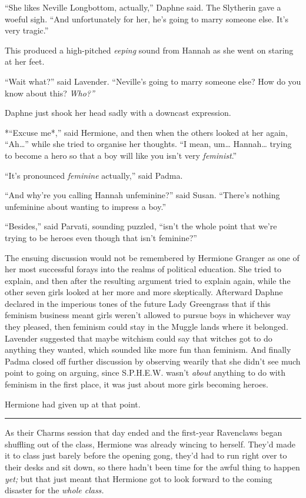 ``She likes Neville Longbottom, actually,'' Daphne said. The Slytherin
gave a woeful sigh. ``And unfortunately for her, he's going to marry
someone else. It's very tragic.''

This produced a high-pitched \emph{eeping} sound from Hannah as she went
on staring at her feet.

``Wait what?'' said Lavender. ``Neville's going to marry someone else?
How do you know about this? \emph{Who?''}

Daphne just shook her head sadly with a downcast expression.

*``Excuse me*,'' said Hermione, and then when the others looked at her
again, ``Ah\ldots{}'' while she tried to organise her thoughts. ``I
mean, um\ldots{} Hannah\ldots{} trying to become a hero so that a boy
will like you isn't very \emph{feminist}.''

``It's pronounced \emph{feminine} actually,'' said Padma.

``And why're you calling Hannah unfeminine?'' said Susan. ``There's
nothing unfeminine about wanting to impress a boy.''

``Besides,'' said Parvati, sounding puzzled, ``isn't the whole point
that we're trying to be heroes even though that isn't feminine?''

The ensuing discussion would not be remembered by Hermione Granger as
one of her most successful forays into the realms of political
education. She tried to explain, and then after the resulting argument
tried to explain again, while the other seven girls looked at her more
and more skeptically. Afterward Daphne declared in the imperious tones
of the future Lady Greengrass that if this feminism business meant girls
weren't allowed to pursue boys in whichever way they pleased, then
feminism could stay in the Muggle lands where it belonged. Lavender
suggested that maybe witchism could say that witches got to do anything
they wanted, which sounded like more fun than feminism. And finally
Padma closed off further discussion by observing wearily that she didn't
see much point to going on arguing, since S.P.H.E.W. wasn't \emph{about}
anything to do with feminism in the first place, it was just about more
girls becoming heroes.

Hermione had given up at that point.

\begin{center}\rule{3in}{0.4pt}\end{center}

As their Charms session that day ended and the first-year Ravenclaws
began shuffling out of the class, Hermione was already wincing to
herself. They'd made it to class just barely before the opening gong,
they'd had to run right over to their desks and sit down, so there
hadn't been time for the awful thing to happen \emph{yet;} but that just
meant that Hermione got to look forward to the coming disaster for the
\emph{whole class.}


